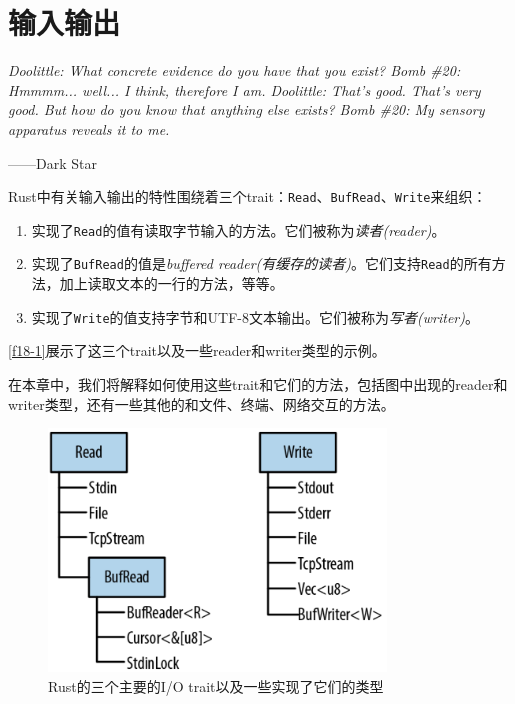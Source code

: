 \chapter{输入输出}\label{ch18}

\emph{Doolittle: What concrete evidence do you have that you exist?
Bomb \#20: Hmmmm... well... I think, therefore I am.
Doolittle: That’s good. That’s very good. But how do you know that anything else exists?
Bomb \#20: My sensory apparatus reveals it to me.}

\begin{flushright}
    ——Dark Star
\end{flushright}

Rust中有关输入输出的特性围绕着三个trait：\texttt{Read}、\texttt{BufRead}、\texttt{Write}来组织：
\begin{enumerate}
    \item 实现了\texttt{Read}的值有读取字节输入的方法。它们被称为\emph{读者(reader)}。
    \item 实现了\texttt{BufRead}的值是\emph{buffered reader(有缓存的读者)}。它们支持\texttt{Read}的所有方法，加上读取文本的一行的方法，等等。
    \item 实现了\texttt{Write}的值支持字节和UTF-8文本输出。它们被称为\emph{写者(writer)}。
\end{enumerate}

\autoref{f18-1}展示了这三个trait以及一些reader和writer类型的示例。

在本章中，我们将解释如何使用这些trait和它们的方法，包括图中出现的reader和writer类型，还有一些其他的和文件、终端、网络交互的方法。

\begin{figure}[htbp]
    \centering
    \includegraphics[width=0.8\textwidth]{../img/f18-1.png}
    \caption{Rust的三个主要的I/O trait以及一些实现了它们的类型}
    \label{f18-1}
\end{figure}

